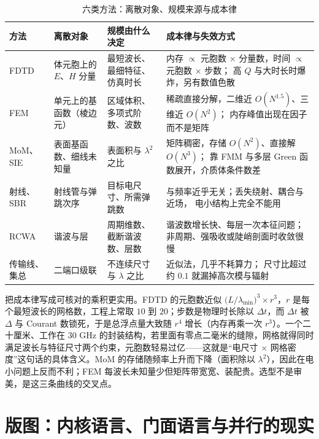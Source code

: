 \documentclass[12pt,a4paper,fontset=fandol]{ctexbook}
\begin{document}
\begin{table}[H]
\centering
\caption{六类方法：离散对象、规模来源与成本律}
\label{tab:ch14-methods}
\small
\begin{tabular}{@{}>{\raggedright\arraybackslash}p{}
  >{\raggedright\arraybackslash}p{}
  >{\raggedright\arraybackslash}p{}
  >{\raggedright\arraybackslash}p{}@{}}
\toprule
方法 & 离散对象 & 规模由什么决定 & 成本律与失效方式 \\
\midrule
FDTD & 体元胞上的 $E$、$H$ 分量 &
  最短波长、最细特征、仿真时长 &
  内存 $\propto$ 元胞数 $\times$ 分量数，时间 $\propto$ 元胞数 $\times$ 步数；
  高 $Q$ 与大时长时爆炸，另有数值色散 \\
FEM & 单元上的基函数（棱边元） &
  区域体积、多项式阶数、波数 &
  稀疏直接分解，二维近 $O(N^{1.5})$、三维近 $O(N^{2})$；
  内存峰值出现在因子而不是矩阵 \\
MoM、SIE & 表面基函数、细线未知量 &
  表面积与 $\lambda^{2}$ 之比 &
  矩阵稠密，存储 $O(N^{2})$、直接解 $O(N^{3})$；
  靠 FMM 与多层 Green 函数展开，介质体条件数差 \\
射线、SBR & 射线管与弹跳次序 &
  目标电尺寸、所需弹跳数 &
  与频率近乎无关；丢失绕射、耦合与近场，
  电小结构上完全不能用 \\
RCWA & 谐波与层 &
  周期维数、截断谐波数、层数 &
  谐波数增长快、每层一次本征问题；
  非周期、强吸收或陡峭剖面时收敛很慢 \\
传输线、集总 & 二端口级联 &
  不连续尺寸与 $\lambda$ 之比 &
  近似法，几乎不耗算力；
  尺寸比超过约 $0.1$ 就漏掉高次模与辐射 \\
\bottomrule
\end{tabular}
\end{table}

把成本律写成可核对的乘积更实用。FDTD 的元胞数近似 $\bigl(L/\lambda_{\min}\bigr)^{3} \times r^{3}$，$r$ 是每个最短波长的网格数，工程上常取 $10$ 到 $20$；步数是物理时长除以 $\Delta t$，而 $\Delta t$ 被 $\Delta$ 与 Courant 数锁死，于是总浮点量大致随 $r^{4}$ 增长（内存再乘一次 $r^{3}$）。一个二十厘米、工作在 $30$ GHz 的封装结构，若里面有零点二毫米的缝隙，网格就得同时满足波长与特征尺寸两个约束，元胞数轻易过亿——这就是``电尺寸 $\times$ 网格密度''这句话的具体含义。MoM 的存储随频率上升而下降（面积除以 $\lambda^{2}$），因此在电小问题上反而不利；FEM 每波长未知量少但矩阵带宽宽、装配贵。选型不是审美，是这三条曲线的交叉点。

\section{版图：内核语言、门面语言与并行的现实}
\end{document}
